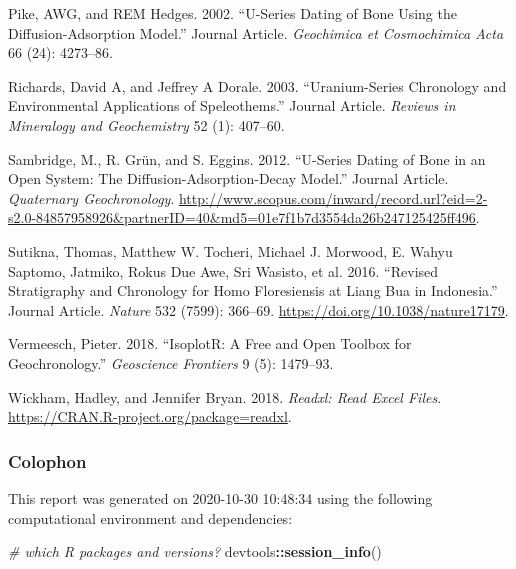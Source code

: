 \documentclass[]{elsarticle} %
\newenvironment{Shaded}{\begin{snugshade}}{\end{snugshade}}
\newcommand{\CommentTok}[1]{\textcolor[rgb]{0.56,0.35,0.01}{\textit{#1}}}
\newcommand{\KeywordTok}[1]{\textcolor[rgb]{0.13,0.29,0.53}{\textbf{#1}}}
\newcommand{\NormalTok}[1]{#1}
\newcommand{\OperatorTok}[1]{\textcolor[rgb]{0.81,0.36,0.00}{\textbf{#1}}}
\begin{document}
\leavevmode\hypertarget{ref-RN2996}{}%
Pike, AWG, and REM Hedges. 2002. ``U-Series Dating of Bone Using the Diffusion-Adsorption Model.'' Journal Article. \emph{Geochimica et Cosmochimica Acta} 66 (24): 4273--86.

\leavevmode\hypertarget{ref-RN4494}{}%
Richards, David A, and Jeffrey A Dorale. 2003. ``Uranium-Series Chronology and Environmental Applications of Speleothems.'' Journal Article. \emph{Reviews in Mineralogy and Geochemistry} 52 (1): 407--60.

\leavevmode\hypertarget{ref-Sambridge2012}{}%
Sambridge, M., R. Grün, and S. Eggins. 2012. ``U-Series Dating of Bone in an Open System: The Diffusion-Adsorption-Decay Model.'' Journal Article. \emph{Quaternary Geochronology}. \url{http://www.scopus.com/inward/record.url?eid=2-s2.0-84857958926\&partnerID=40\&md5=01e7f1b7d3554da26b247125425ff496}.

\leavevmode\hypertarget{ref-Sutikna2016}{}%
Sutikna, Thomas, Matthew W. Tocheri, Michael J. Morwood, E. Wahyu Saptomo, Jatmiko, Rokus Due Awe, Sri Wasisto, et al. 2016. ``Revised Stratigraphy and Chronology for Homo Floresiensis at Liang Bua in Indonesia.'' Journal Article. \emph{Nature} 532 (7599): 366--69. \url{https://doi.org/10.1038/nature17179}.

\leavevmode\hypertarget{ref-vermeesch2018isoplotr}{}%
Vermeesch, Pieter. 2018. ``IsoplotR: A Free and Open Toolbox for Geochronology.'' \emph{Geoscience Frontiers} 9 (5): 1479--93.

\leavevmode\hypertarget{ref-Wickham_readxl}{}%
Wickham, Hadley, and Jennifer Bryan. 2018. \emph{Readxl: Read Excel Files}. \url{https://CRAN.R-project.org/package=readxl}.

\newpage

\hypertarget{colophon}{%
\subsubsection{Colophon}\label{colophon}}

This report was generated on 2020-10-30 10:48:34 using the following computational environment and dependencies:

\begin{Shaded}
\begin{Highlighting}[]
\CommentTok{# which R packages and versions?}
\NormalTok{devtools}\OperatorTok{::}\KeywordTok{session_info}\NormalTok{()}
\end{Highlighting}
\end{Shaded}
\end{document}
